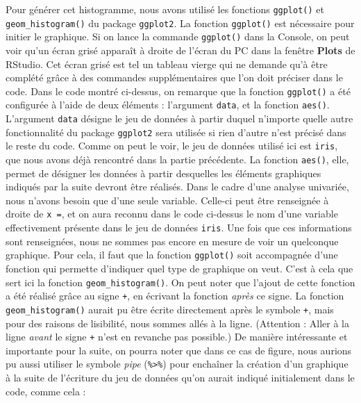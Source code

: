 \documentclass[
  french,
]{book}
\newenvironment{Shaded}{\begin{snugshade}}{\end{snugshade}}
\newcommand{\CommentTok}[1]{\textcolor[rgb]{0.56,0.35,0.01}{\textit{#1}}}
\newcommand{\DataTypeTok}[1]{\textcolor[rgb]{0.13,0.29,0.53}{#1}}
\newcommand{\KeywordTok}[1]{\textcolor[rgb]{0.13,0.29,0.53}{\textbf{#1}}}
\newcommand{\NormalTok}[1]{#1}
\newcommand{\OperatorTok}[1]{\textcolor[rgb]{0.81,0.36,0.00}{\textbf{#1}}}
\newcommand{\StringTok}[1]{\textcolor[rgb]{0.31,0.60,0.02}{#1}}
\begin{document}
Pour générer cet histogramme, nous avons utilisé les fonctions \texttt{ggplot()} et \texttt{geom\_histogram()} du package \texttt{ggplot2}. La fonction \texttt{ggplot()} est nécessaire pour initier le graphique. Si on lance la commande \texttt{ggplot()} dans la Console, on peut voir qu'un écran grisé apparaît à droite de l'écran du PC dans la fenêtre \textbf{Plots} de RStudio. Cet écran grisé est tel un tableau vierge qui ne demande qu'à être complété grâce à des commandes supplémentaires que l'on doit préciser dans le code. Dans le code montré ci-dessus, on remarque que la fonction \texttt{ggplot()} a été configurée à l'aide de deux éléments : l'argument \texttt{data}, et la fonction \texttt{aes()}. L'argument \texttt{data} désigne le jeu de données à partir duquel n'importe quelle autre fonctionnalité du package \texttt{ggplot2} sera utilisée si rien d'autre n'est précisé dans le reste du code. Comme on peut le voir, le jeu de données utilisé ici est \texttt{iris}, que nous avons déjà rencontré dans la partie précédente. La fonction \texttt{aes()}, elle, permet de désigner les données à partir desquelles les éléments graphiques indiqués par la suite devront être réalisés. Dans le cadre d'une analyse univariée, nous n'avons besoin que d'une seule variable. Celle-ci peut être renseignée à droite de \texttt{x\ =}, et on aura reconnu dans le code ci-dessus le nom d'une variable effectivement présente dans le jeu de données \texttt{iris}. Une fois que ces informations sont renseignées, nous ne sommes pas encore en mesure de voir un quelconque graphique. Pour cela, il faut que la fonction \texttt{ggplot()} soit accompagnée d'une fonction qui permette d'indiquer quel type de graphique on veut. C'est à cela que sert ici la fonction \texttt{geom\_histogram()}. On peut noter que l'ajout de cette fonction a été réalisé grâce au signe \texttt{+}, en écrivant la fonction \emph{après} ce signe. La fonction \texttt{geom\_histogram()} aurait pu être écrite directement après le symbole \texttt{+}, mais pour des raisons de lisibilité, nous sommes allés à la ligne. (Attention : Aller à la ligne \emph{avant} le signe \texttt{+} n'est en revanche pas possible.) De manière intéressante et importante pour la suite, on pourra noter que dans ce cas de figure, nous aurions pu aussi utiliser le symbole \emph{pipe} (\texttt{\%\textgreater{}\%}) pour enchaîner la création d'un graphique à la suite de l'écriture du jeu de données qu'on aurait indiqué initialement dans le code, comme cela :

\begin{Shaded}
\end{Shaded}
\end{document}
